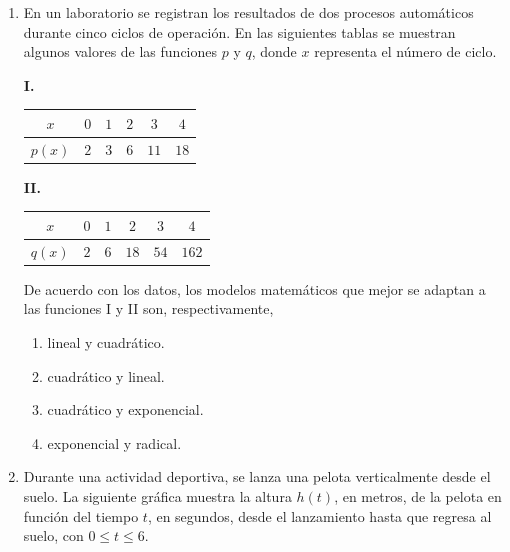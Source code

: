 \documentclass[12pt]{article}
\begin{document}
\begin{enumerate}[label=\textbf{\arabic*.}, start=29, itemsep=1cm]
\Needspace{0.58\textheight}
\item
En un laboratorio se registran los resultados de dos procesos autom\'aticos durante cinco ciclos de operaci\'on. En las siguientes tablas se muestran algunos valores de las funciones $p$ y $q$, donde $x$ representa el n\'umero de ciclo.

\begin{center}
\begin{minipage}{0.43\textwidth}
\centering
\textbf{I.}\\[3pt]
\renewcommand{\arraystretch}{1.35}
\begin{tabular}{|c|c|c|c|c|c|}
\hline
$x$ & $0$ & $1$ & $2$ & $3$ & $4$ \\ \hline
$p(x)$ & $2$ & $3$ & $6$ & $11$ & $18$ \\ \hline
\end{tabular}
\end{minipage}
\hfill
\begin{minipage}{0.43\textwidth}
\centering
\textbf{II.}\\[3pt]
\renewcommand{\arraystretch}{1.35}
\begin{tabular}{|c|c|c|c|c|c|}
\hline
$x$ & $0$ & $1$ & $2$ & $3$ & $4$ \\ \hline
$q(x)$ & $2$ & $6$ & $18$ & $54$ & $162$ \\ \hline
\end{tabular}
\end{minipage}
\end{center}

De acuerdo con los datos, los modelos matem\'aticos que mejor se adaptan a las funciones I y II son, respectivamente,

\begin{enumerate}[label=\Alph*)]
  \item lineal y cuadr\'atico.
  \item cuadr\'atico y lineal.
  \item cuadr\'atico y exponencial.
  \item exponencial y radical.
\end{enumerate}

\Needspace{0.76\textheight}
\item
Durante una actividad deportiva, se lanza una pelota verticalmente desde el suelo. La siguiente gr\'afica muestra la altura $h(t)$, en metros, de la pelota en funci\'on del tiempo $t$, en segundos, desde el lanzamiento hasta que regresa al suelo, con $0\leq t\leq 6$.


\end{enumerate}
\end{document}
